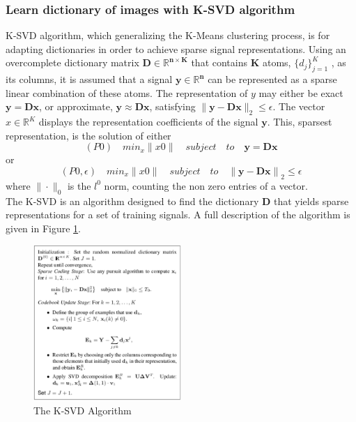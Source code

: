 \subsubsection{Learn dictionary of images with K-SVD algorithm}
K-SVD \cite{ksvd}algorithm, which generalizing the K-Means clustering process, is for adapting dictionaries in order to achieve sparse signal representations. Using an overcomplete dictionary matrix $\mathbf{D \in \mathbb{R}^{n\times K} }$ that contains $\mathbf{K}$ atoms, $\{d_j\}_{j = 1}^K $ , as its columns, it is assumed that a signal $\mathbf{y \in \mathbb{R}^n}$ can be represented as a sparse linear combination of these atoms. The representation of $y$ may either be exact $\mathbf{y = Dx}$, or approximate, $\mathbf{y} \approx \mathbf{Dx}$, satisfying $\|\mathbf{y - Dx}\|_2 \leq \epsilon$. The vector $x \in \mathbb{R}^K$ displays the representation coefficients of the signal $\mathbf{y}$. This, sparsest representation, is the solution of either 
\begin{equation}
(P0 )\quad    min_x\|x0\|\quad subject\quad to \quad\mathbf{y = Dx}
\end{equation}
 or 
\begin{equation}
(P0, \epsilon)\quad    min_x\|x0\| \quad  subject\quad  to \quad \mathbf{\|y - Dx\|}_2 \leq \epsilon
\end{equation}
where $\|\cdot\|_0$ is the $l^0$ norm, counting the non zero entries of a vector.\\

The K-SVD is an algorithm designed to find the dictionary $\mathbf{D}$ that yields sparse representations for a set of training signals. A full description of the algorithm is given in Figure \ref{fig:ksvd}.\\
\begin{figure}
  \centering
  \includegraphics[width=0.5\textwidth]{KSVD}
  \caption{The K-SVD Algorithm}
  \label{fig:ksvd}
\end{figure}


